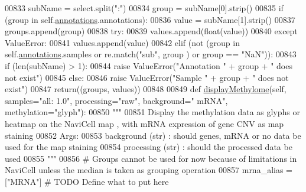 \begin{DoxyCode}
00833             subName = select.split(\textcolor{stringliteral}{":"})
00834             group = subName[0].strip()
00835             \textcolor{keywordflow}{if} (group \textcolor{keywordflow}{in} self.\hyperlink{classnavicom_1_1navicom_1_1NaviCom_a0386d881214943cf3432d0ffe22cbb71}{annotations}.annotations):
00836                 value = subName[1].strip()
00837                 groups.append(group)
00838                 \textcolor{keywordflow}{try}:
00839                     values.append(float(value))
00840                 \textcolor{keywordflow}{except} ValueError:
00841                     values.append(value)
00842             \textcolor{keywordflow}{elif} (\textcolor{keywordflow}{not} (group \textcolor{keywordflow}{in} self.\hyperlink{classnavicom_1_1navicom_1_1NaviCom_a0386d881214943cf3432d0ffe22cbb71}{annotations}.samples \textcolor{keywordflow}{or} re.match(\textcolor{stringliteral}{"sub"}, group
      ) \textcolor{keywordflow}{or} group == \textcolor{stringliteral}{"NaN"})):
00843                 \textcolor{keywordflow}{if} (len(subName) > 1):
00844                     \textcolor{keywordflow}{raise} ValueError(\textcolor{stringliteral}{"Annotation "} + group + \textcolor{stringliteral}{" does not exist"})
00845                 \textcolor{keywordflow}{else}:
00846                     \textcolor{keywordflow}{raise} ValueError(\textcolor{stringliteral}{"Sample "} + group + \textcolor{stringliteral}{" does not exist"})
00847         \textcolor{keywordflow}{return}((groups, values))
00848 
00849     \textcolor{keyword}{def }\hyperlink{classnavicom_1_1navicom_1_1NaviCom_a018f936de625af8a5dd7e8250ede6483}{displayMethylome}(self, samples="all: 1.0\textcolor{stringliteral}{", processing="}raw\textcolor{stringliteral}{", background="
      }mRNA\textcolor{stringliteral}{", methylation="}glyph\textcolor{stringliteral}{"):}
00850 \textcolor{stringliteral}{        }\textcolor{stringliteral}{"""}
00851 \textcolor{stringliteral}{            Display the methylation data as glyphs or heatmap on the NaviCell map
      , with mRNA expression of gene CNV as map staining}
00852 \textcolor{stringliteral}{            Args:}
00853 \textcolor{stringliteral}{                background (str) : should genes, mRNA or no data be used for the 
      map staining}
00854 \textcolor{stringliteral}{                processing (str) : should the processed data be used}
00855 \textcolor{stringliteral}{        """}
00856         \textcolor{comment}{# Groups cannot be used for now because of limitations in NaviCell unless
       the median is taken as grouping operation}
00857         mrna\_alias = [\textcolor{stringliteral}{"MRNA"}] \textcolor{comment}{# TODO Define what to put here}

\end{DoxyCode}
